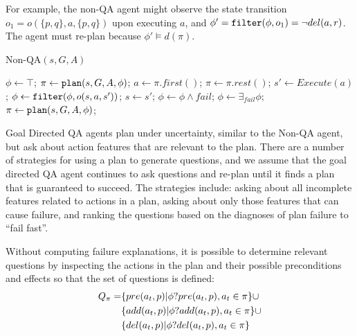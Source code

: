 \documentclass{article}
\begin{document}
For example, the non-QA agent might observe the state transition $o_1
= o(\{p,q\}, a, \{p,q\})$ upon executing $a$, and $\phi' = {\tt filter}(\phi,
o_1) = \neg del(a, r)$.  The agent must re-plan because $\phi' \models d(\pi)$.



\begin{algorithm}[t]
\caption{Non-QA$(s, G, {A})$}
\label{replan}
  \begin{algorithmic}[1]
\STATE $\phi \leftarrow \top$; $\pi \leftarrow {\tt plan}(s, G, {A}, \phi)$;
\STATE $a \leftarrow \pi.first()$; $\pi \leftarrow \pi.rest()$;
\STATE $s ' \leftarrow Execute(a)$; 
\STATE $\phi \leftarrow {\tt filter}(\phi, o(s, a, s'))$; 
\STATE $s \leftarrow s'$; 
\ELSE 
\STATE  $\phi \leftarrow \phi \wedge fail$; 
 \ENDIF
\STATE  	 $\phi \leftarrow \exists_{fail}  \phi$;
\STATE  	 $\pi \leftarrow {\tt plan}(s, G, {A}, \phi)$;
 \ENDIF
\ENDWHILE
\end{algorithmic}
\end{algorithm}


Goal Directed QA agents plan under uncertainty, similar to
the Non-QA agent, but ask about action features that are relevant to the plan.
There are a number of strategies for using a plan to generate questions, and we assume
that the goal directed QA agent continues to ask questions and re-plan until it
finds a plan that is guaranteed to succeed. The strategies include: asking about
all incomplete features related to actions in a plan, asking about only those
features that can cause failure, and ranking the questions based on the
diagnoses of plan failure to ``fail fast''.

 Without computing failure explanations, it is
possible to determine relevant questions by inspecting the actions in the plan
and their possible preconditions and effects so that the set of questions is
defined:
\begin{align}
Q_{\pi} =&  \{pre(a_t, p) | \phi?pre(a_t, p), a_t \in \pi\}
\cup\notag\\ &\{add(a_t, p)| \phi?add(a_t, p), a_t \in \pi\} \cup\notag\\ 
&\{del(a_t,p)|\phi?del(a_t, p), a_t \in \pi\}\notag
\end{align}
\end{document}
